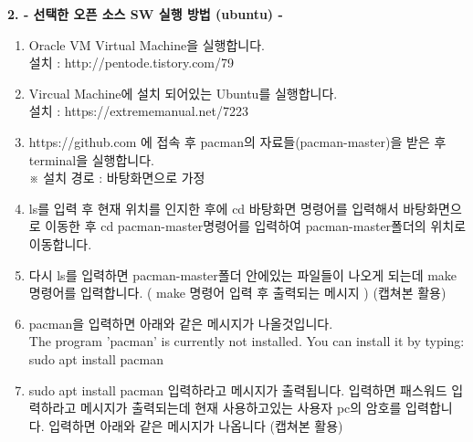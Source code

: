 \documentclass{article}
\begin{document}
\newpage
\begin{large}\textbf{2. - 선택한 오픈 소스 SW 실행 방법 (ubuntu) -}\end{large}
\begin{enumerate}
\item Oracle VM Virtual Machine을 실행합니다. \\
설치 : http://pentode.tistory.com/79\\

\item Vircual Machine에 설치 되어있는 Ubuntu를 실행합니다. \\
설치 : https://extrememanual.net/7223\\

\item https://github.com 에 접속 후 pacman의 자료들(pacman-master)을 받은 후 terminal을 실행합니다. \\※ 설치 경로 : 바탕화면으로 가정\\
\item ls를 입력 후 현재 위치를 인지한 후에 cd 바탕화면 명령어를 입력해서 바탕화면으로 이동한 후 cd pacman-master명령어를 입력하여 pacman-master폴더의 위치로 이동합니다.\\
\item 다시 ls를 입력하면 pacman-master폴더 안에있는 파일들이 나오게 되는데 make 명령어를 입력합니다. ( make 명령어 입력 후 출력되는 메시지 ) (캡쳐본 활용)\\
\item pacman을 입력하면 아래와 같은 메시지가 나올것입니다. \\
The program 'pacman' is currently not installed. You can install it by typing: sudo apt install pacman\\
\item sudo apt install pacman 입력하라고 메시지가 출력됩니다. 입력하면 패스워드 입력하라고 메시지가 출력되는데 현재 사용하고있는 사용자 pc의 암호를 입력합니다. 입력하면 아래와 같은 메시지가 나옵니다 (캡쳐본 활용)
\end{enumerate}
\end{document}
